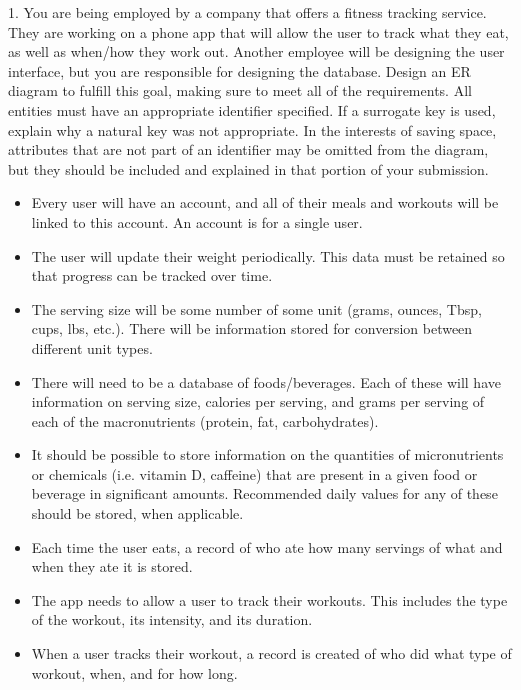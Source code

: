 \documentclass{report}
\begin{document}
    \begin{mdframed}
        1. You are being employed by a company that offers a fitness tracking service. They are working on a phone app that will allow the user to track what they
        eat, as well as when/how they work out. Another employee will be designing the user interface, but you are responsible for designing the database. Design
        an ER diagram to fulfill this goal, making sure to meet all of the requirements. All entities must have an appropriate identifier specified. If a surrogate key
        is used, explain why a natural key was not appropriate. In the interests of saving space, attributes that are not part of an identifier may be omitted from the
        diagram, but they should be included and explained in that portion of your submission. 
        \begin{itemize}
            \item Every user will have an account, and all of their meals and workouts will be linked to this account. An account is for a single user.
            \item The user will update their weight periodically. This data must be retained so that progress can be tracked over time.
            \item The serving size will be some number of some unit (grams, ounces, Tbsp, cups, lbs, etc.). There will be information stored for conversion between different unit types.
            \item There will need to be a database of foods/beverages. Each of these will have information on serving size, calories per serving, and grams per serving of each of the macronutrients (protein, fat, carbohydrates).
            \item It should be possible to store information on the quantities of micronutrients or chemicals (i.e. vitamin D, caffeine) that are present in a given food or beverage in significant amounts. Recommended daily values for any of these should be stored, when applicable.
            \item Each time the user eats, a record of who ate how many servings of what and when they ate it is stored.
            \item The app needs to allow a user to track their workouts. This includes the type of the workout, its intensity, and its duration.
            \item When a user tracks their workout, a record is created of who did what type of workout, when, and for how long.
        \end{itemize}
    \end{mdframed}
    \bigbreak \noindent 
    \bigbreak \noindent 
\begin{figure}[ht]
    \centering
    \label{fig:1}
\end{figure}



    
\end{document}
